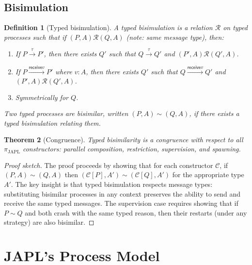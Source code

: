 \documentclass[11pt,a4paper]{article}
\newtheorem{theorem}{Theorem}[section]
\newtheorem{definition}[theorem]{Definition}
\newcommand{\bisim}{\sim}
\newcommand{\recvf}{\mathsf{receive}}
\begin{document}
\subsection{Bisimulation}

\begin{definition}[Typed bisimulation]\label{def:bisim}
A \emph{typed bisimulation} is a relation $\mathcal{R}$ on typed processes such that if $(P, A) \mathcal{R} (Q, A)$ (note: same message type), then:
\begin{enumerate}
\item If $P \xrightarrow{\tau} P'$, then there exists $Q'$ such that $Q \xrightarrow{\tau} Q'$ and $(P', A) \mathcal{R} (Q', A)$.
\item If $P \xrightarrow{\recvf{}{v}} P'$ where $v : A$, then there exists $Q'$ such that $Q \xrightarrow{\recvf{}{v}} Q'$ and $(P', A) \mathcal{R} (Q', A)$.
\item Symmetrically for $Q$.
\end{enumerate}
Two typed processes are \emph{bisimilar}, written $(P, A) \bisim (Q, A)$, if there exists a typed bisimulation relating them.
\end{definition}

\begin{theorem}[Congruence]\label{thm:congruence}
Typed bisimilarity is a congruence with respect to all $\pi_{\text{JAPL}}$ constructors: parallel composition, restriction, supervision, and spawning.
\end{theorem}

\begin{proof}[Proof sketch]
The proof proceeds by showing that for each constructor $\mathcal{C}$, if $(P, A) \bisim (Q, A)$ then $(\mathcal{C}[P], A') \bisim (\mathcal{C}[Q], A')$ for the appropriate type $A'$. The key insight is that typed bisimulation respects message types: substituting bisimilar processes in any context preserves the ability to send and receive the same typed messages. The supervision case requires showing that if $P \bisim Q$ and both crash with the same typed reason, then their restarts (under any strategy) are also bisimilar.
\end{proof}


\section{JAPL's Process Model}\label{sec:process-model}
\end{document}
